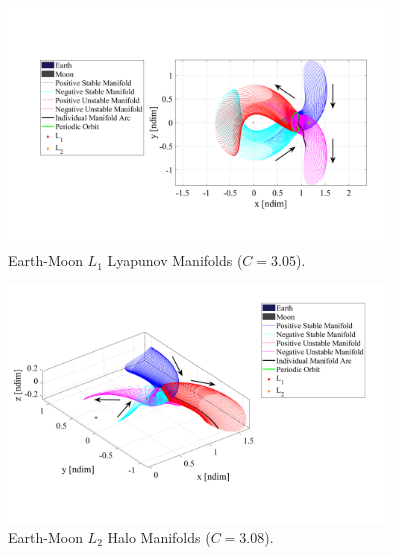 \begin{figure}[ht]
    \centering
    \includegraphics[width=0.9\textwidth]{figures/LyapunovManifold.pdf}
    \caption{Earth-Moon $L_{1}$ Lyapunov Manifolds ($C=3.05$).}
    \label{fig:LyapunovManifold}
\end{figure}

\begin{figure}[ht]
    \centering
    \includegraphics[width=0.9\textwidth]{figures/HaloManifold.pdf}
    \caption{Earth-Moon $L_{2}$ Halo Manifolds ($C=3.08$).}
    \label{fig:haloManifold}
\end{figure}

